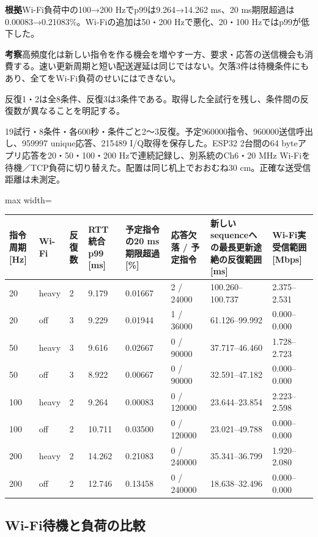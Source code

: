 \documentclass[a4paper,10pt]{ltjsarticle}
\begin{document}
\noindent\textbf{根拠}\quad Wi-Fi負荷中の100→200 Hzでp99は9.264→14.262 ms、20 ms期限超過は0.00083→0.21083\%。Wi-Fiの追加は50・200 Hzで悪化、20・100 Hzではp99が低下した。

\noindent\textbf{考察}\quad 高頻度化は新しい指令を作る機会を増やす一方、要求・応答の送信機会も消費する。速い更新周期と短い配送遅延は同じではない。欠落3件は待機条件にもあり、全てをWi-Fi負荷のせいにはできない。

反復1・2は全8条件、反復3は3条件である。取得した全試行を残し、条件間の反復数が異なることを明記する。

19試行・8条件・各600秒・条件ごと2〜3反復。予定960000指令、960000送信呼出し、959997 unique応答、215489 I/Q取得を保存した。ESP32 2台間の64 byteアプリ応答を20・50・100・200 Hzで連続記録し、別系統のCh6・20 MHz Wi-Fiを待機／TCP負荷に切り替えた。配置は同じ机上でおおむね30 cm。正確な送受信距離は未測定。

\begin{center}\small\begin{adjustbox}{max width=\linewidth}
\begin{tabular}{llllllll}\toprule
指令周期 [Hz] & Wi-Fi & 反復数 & RTT統合p99 [ms] & 予定指令の20 ms期限超過 [\%] & 応答欠落 / 予定指令 & 新しいsequenceへの最長更新途絶の反復範囲 [ms] & Wi-Fi実受信範囲 [Mbps]\\
\midrule
20 & heavy & 2 & 9.179 & 0.01667 & 2 / 24000 & 100.260–100.737 & 2.375–2.531\\
20 & off & 3 & 9.229 & 0.01944 & 1 / 36000 & 61.126–99.992 & 0.000–0.000\\
50 & heavy & 3 & 9.616 & 0.02667 & 0 / 90000 & 37.717–46.460 & 1.728–2.723\\
50 & off & 3 & 8.922 & 0.00667 & 0 / 90000 & 32.591–47.182 & 0.000–0.000\\
100 & heavy & 2 & 9.264 & 0.00083 & 0 / 120000 & 23.644–23.854 & 2.223–2.598\\
100 & off & 2 & 10.711 & 0.03500 & 0 / 120000 & 23.021–49.788 & 0.000–0.000\\
200 & heavy & 2 & 14.262 & 0.21083 & 0 / 240000 & 35.341–36.799 & 1.920–2.080\\
200 & off & 2 & 12.746 & 0.13458 & 0 / 240000 & 18.638–32.496 & 0.000–0.000\\
\bottomrule\end{tabular}\end{adjustbox}\end{center}

\subsection{Wi-Fi待機と負荷の比較}
\end{document}
